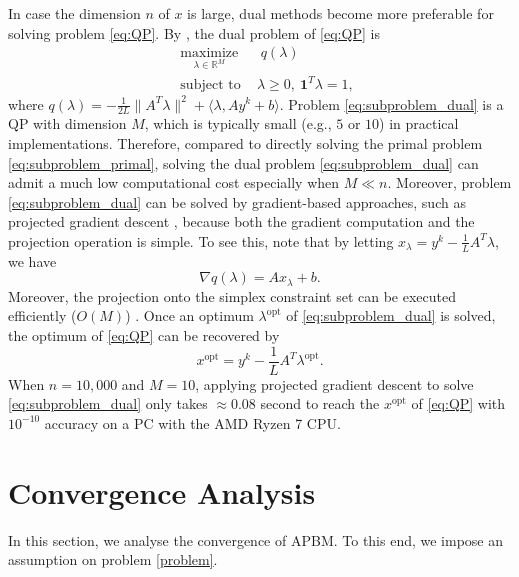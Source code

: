 \documentclass[letterpaper, 10 pt, conference]{ieeeconf}  %
\begin{document}
In case the dimension $n$ of $x$ is large, dual methods become more preferable for solving problem \eqref{eq:QP}. By \cite[Lemma 2.4.1]{lemarechal1993convex}, the dual problem of \eqref{eq:QP} is 
\begin{equation}\label{eq:subproblem_dual}
    \begin{split}
        &\underset{\lambda\in\mathbb{R}^M}{\operatorname{maximize}} ~~~~~~ q(\lambda) \\
        &\operatorname{subject ~to}   ~~~~\lambda  \geq 0, ~\mathbf{1}^T\lambda = 1,
    \end{split}
\end{equation}
where $q(\lambda) = -\frac{1}{2L}\|A^T\lambda\|^2+\langle \lambda,Ay^k+b\rangle$. Problem \eqref{eq:subproblem_dual} is a QP with dimension $M$, which is typically small (e.g., $5$ or $10$) in practical implementations. Therefore, compared to directly solving the primal problem \eqref{eq:subproblem_primal}, solving the dual problem \eqref{eq:subproblem_dual} can admit a much low computational cost especially when $M\ll n$. Moreover, problem \eqref{eq:subproblem_dual} can be solved by gradient-based approaches, such as projected gradient descent \cite{boyd2004convex}, because both the gradient computation and the projection operation is simple. To see this, note that by letting $x_\lambda = y^k-\frac{1}{L}A^T\lambda$, we have
\begin{equation*}
 \nabla q(\lambda) = Ax_\lambda+b.
\end{equation*}
Moreover, the projection onto the simplex constraint set can be executed efficiently ($O(M)$) \cite{condat2016fast}.  Once an optimum $\lambda^{\operatorname{opt}}$ of \eqref{eq:subproblem_dual} is solved, the optimum of \eqref{eq:QP} can be recovered by
\begin{equation*}
    x^{\operatorname{opt}} =  y^k-\frac{1}{L}A^T\lambda^{\operatorname{opt}}.
\end{equation*}
When $n=10,000$ and $M=10$, applying projected gradient descent to solve \eqref{eq:subproblem_dual} only takes  $\approx 0.08$ second to reach the $x^{\operatorname{opt}}$ of \eqref{eq:QP} with $10^{-10}$ accuracy on a PC with the AMD Ryzen 7 CPU. 


\section{Convergence Analysis}\label{sec:convergence}
In this section, we analyse the convergence of APBM. To this end, we impose an assumption on problem \eqref{problem}.
\end{document}

